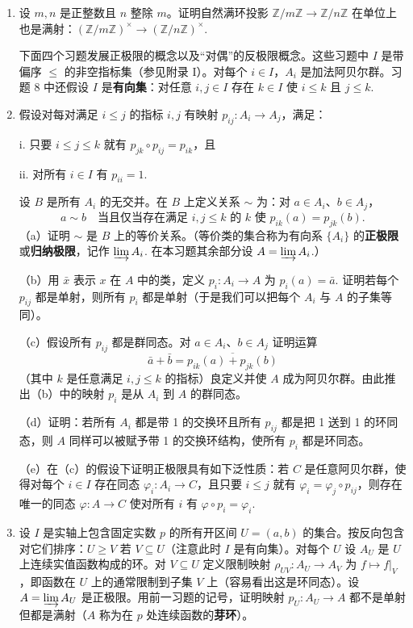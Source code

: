 \begin{enumerate}
\item 设 \(m, n\) 是正整数且 \(n\) 整除 \(m\)。证明自然满环投影 \(\mathbb{Z}/m\mathbb{Z} \to \mathbb{Z}/n\mathbb{Z}\) 在单位上也是满射：\((\mathbb{Z}/m\mathbb{Z})^\times \to (\mathbb{Z}/n\mathbb{Z})^\times\).

\noindent 下面四个习题发展正极限的概念以及“对偶”的反极限概念。这些习题中 \(I\) 是带偏序 \(\leq\) 的非空指标集（参见附录 I）。对每个 \(i \in I\)，\(A_i\) 是加法阿贝尔群。习题 8 中还假设 \(I\) 是\textbf{有向集}：对任意 \(i, j \in I\) 存在 \(k \in I\) 使 \(i \leq k\) 且 \(j \leq k\).

\item 假设对每对满足 \(i \leq j\) 的指标 \(i, j\) 有映射 \(p_{ij} : A_i \to A_j\)，满足：

i. 只要 \(i \leq j \leq k\) 就有 \(p_{jk} \circ p_{ij} = p_{ik}\)，且

ii. 对所有 \(i \in I\) 有 \(p_{ii} = 1\).

设 \(B\) 是所有 \(A_i\) 的无交并。在 \(B\) 上定义关系 \(\sim\) 为：对 \(a \in A_i\)、\(b \in A_j\)，
\[
a \sim b \quad \text{当且仅当存在满足 } i, j \leq k \text{ 的 } k \text{ 使 } p_{ik}(a) = p_{jk}(b).
\]
（a）证明 \(\sim\) 是 \(B\) 上的等价关系。（等价类的集合称为有向系 \(\{A_i\}\) 的\textbf{正极限}或\textbf{归纳极限}，记作 \(\varinjlim A_i\). 在本习题其余部分设 \(A = \varinjlim A_i\).）

（b）用 \(\bar{x}\) 表示 \(x\) 在 \(A\) 中的类，定义 \(p_i : A_i \to A\) 为 \(p_i(a) = \bar{a}\). 证明若每个 \(p_{ij}\) 都是单射，则所有 \(p_i\) 都是单射（于是我们可以把每个 \(A_i\) 与 \(A\) 的子集等同）。

（c）假设所有 \(p_{ij}\) 都是群同态。对 \(a \in A_i\)、\(b \in A_j\) 证明运算
\[
\bar{a} + \bar{b} = \overline{p_{ik}(a) + p_{jk}(b)}
\]
（其中 \(k\) 是任意满足 \(i, j \leq k\) 的指标）良定义并使 \(A\) 成为阿贝尔群。由此推出（b）中的映射 \(p_i\) 是从 \(A_i\) 到 \(A\) 的群同态。

（d）证明：若所有 \(A_i\) 都是带 1 的交换环且所有 \(p_{ij}\) 都是把 1 送到 1 的环同态，则 \(A\) 同样可以被赋予带 1 的交换环结构，使所有 \(p_i\) 都是环同态。

（e）在（c）的假设下证明正极限具有如下泛性质：若 \(C\) 是任意阿贝尔群，使得对每个 \(i \in I\) 存在同态 \(\varphi_i : A_i \to C\)，且只要 \(i \leq j\) 就有 \(\varphi_i = \varphi_j \circ p_{ij}\)，则存在唯一的同态 \(\varphi : A \to C\) 使对所有 \(i\) 有 \(\varphi \circ p_i = \varphi_i\).

\item 设 \(I\) 是实轴上包含固定实数 \(p\) 的所有开区间 \(U = (a, b)\) 的集合。按反向包含对它们排序：\(U \geq V\) 若 \(V \subseteq U\)（注意此时 \(I\) 是有向集）。对每个 \(U\) 设 \(A_U\) 是 \(U\) 上连续实值函数构成的环。对 \(V \subseteq U\) 定义限制映射 \(\rho_{UV} : A_U \to A_V\) 为 \(f \mapsto f|_V\)，即函数在 \(U\) 上的通常限制到子集 \(V\) 上（容易看出这是环同态）。设 \(A = \varinjlim A_U\) 是正极限。用前一习题的记号，证明映射 \(p_U : A_U \to A\) 都不是单射但都是满射（\(A\) 称为在 \(p\) 处连续函数的\textbf{芽环}）。


\end{enumerate}
